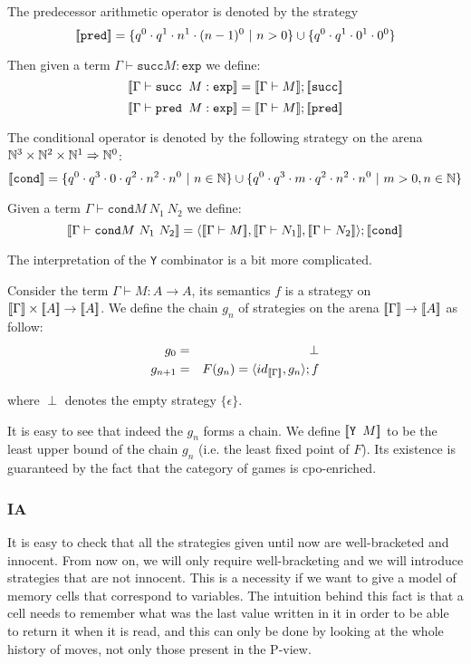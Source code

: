 The predecessor arithmetic operator is denoted by the strategy
$${[\![ \texttt{pred} ]\!]} = \{q^0 \cdot q^1 \cdot n^1 \cdot (n-1)^0\ |\ n >0 \} \cup \{ q^0 \cdot q^1 \cdot 0^1 \cdot 0^0 \} $$

Then given a term $\Gamma \vdash \texttt{succ} M : \texttt{exp}$ we define:
$${[\![ \Gamma \vdash \texttt{succ } M : \texttt{exp} ]\!]} = {[\![ \Gamma \vdash M ]\!]} ; {[\![ \texttt{succ} ]\!]} $$
$${[\![ \Gamma \vdash \texttt{pred } M : \texttt{exp} ]\!]} = {[\![ \Gamma \vdash M ]\!]} ; {[\![ \texttt{pred} ]\!]} $$


The conditional operator is denoted by the following strategy on the arena $\mathbb{N}^3 \times \mathbb{N}^2 \times \mathbb{N} ^1 \Rightarrow \mathbb{N}^0$:
$${[\![ \texttt{cond} ]\!]} =
    \{ q^0 \cdot q^3 \cdot 0 \cdot q^2 \cdot n^2 \cdot n^0 \ | \ n \in \mathbb{N} \}
    \cup
    \{ q^0 \cdot q^3 \cdot m \cdot q^2 \cdot n^2 \cdot n^0 \ | \ m >0, n \in \mathbb{N} \}
    $$


Given a term $\Gamma \vdash \texttt{cond} M\ N_1\ N_2$ we define:
$$\sem{\Gamma \vdash \texttt{cond} M\ N_1\ N_2} =
\langle \sem{\Gamma \vdash M}, \sem{\Gamma \vdash N_1}, \sem{\Gamma \vdash N_2} \rangle ; \sem{\texttt{cond}}$$


The interpretation of the \texttt{Y} combinator is a bit more complicated.

Consider the term $\Gamma \vdash M : A \rightarrow A$, its semantics $f$ is a strategy on ${[\![ \Gamma ]\!]} \times {[\![A ]\!]} \rightarrow {[\![A ]\!]}$.
We define the chain $g_n$ of strategies on the arena ${[\![ \Gamma ]\!]} \rightarrow {[\![A ]\!]}$ as follow:
\begin{eqnarray*}
g_0 &=& \perp \\
g_{n+1} &=&  F(g_n) = \langle id_{{[\![ \Gamma ]\!]}}, g_n\rangle ; f
\end{eqnarray*}

where $\perp$ denotes the empty strategy $\{ \epsilon \}$.

It is easy to see that indeed the $g_n$ forms a chain.
We define ${[\![ \texttt{Y } M ]\!]}$ to be the least upper bound of the chain $g_n$
(i.e. the  least fixed point of $F$). Its existence is guaranteed by the fact that
the category of games is cpo-enriched.

\subsubsection{IA}

It is easy to check that all the strategies given until now are well-bracketed and innocent.
From now on, we will only require well-bracketing and we will introduce strategies that are
not innocent. This is a necessity if we want to give a model of memory cells that correspond
to variables. The intuition behind this fact is that a cell needs to remember what was the last value written in it
in order to be able to return it when it is read, and this can only be done by looking at the whole history of moves,
not only those present in the P-view.






